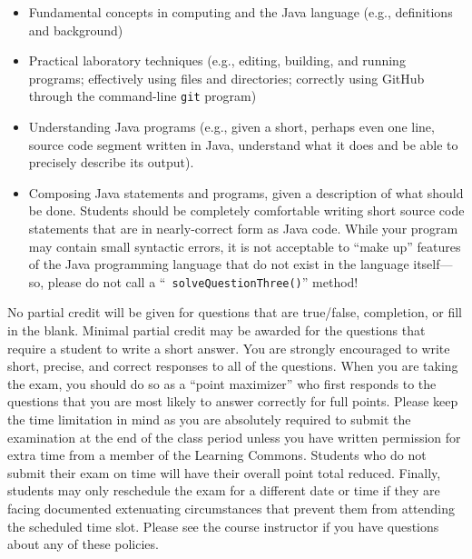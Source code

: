 \documentclass[11pt]{article}
\begin{document}
\vspace*{-.05in}
\begin{itemize}

  \itemsep 0in

  \item Fundamental concepts in computing and the Java language (e.g.,
    definitions and background)

  \item Practical laboratory techniques (e.g., editing, building, and running
    programs; effectively using files and directories; correctly using GitHub
    through the command-line {\tt git} program)

  \item Understanding Java programs (e.g., given a short, perhaps even one line,
    source code segment written in Java, understand what it does and be able to
    precisely describe its output).

  \item Composing Java statements and programs, given a description of what
    should be done. Students should be completely comfortable writing short
    source code statements that are in nearly-correct form as Java code. While
    your program may contain small syntactic errors, it is not acceptable to
    ``make up'' features of the Java programming language that do not exist in
    the language itself---so, please do not call a ``{\tt
    solveQuestionThree()}'' method!

\end{itemize}

\noindent No partial credit will be given for questions that are true/false,
completion, or fill in the blank. Minimal partial credit may be awarded for the
questions that require a student to write a short answer. You are strongly
encouraged to write short, precise, and correct responses to all of the
questions. When you are taking the exam, you should do so as a ``point
maximizer'' who first responds to the questions that you are most likely to
answer correctly for full points. Please keep the time limitation in mind as you
are absolutely required to submit the examination at the end of the class period
unless you have written permission for extra time from a member of the Learning
Commons. Students who do not submit their exam on time will have their overall
point total reduced. Finally, students may only reschedule the exam for a
different date or time if they are facing documented extenuating circumstances
that prevent them from attending the scheduled time slot. Please see the course
instructor if you have questions about any of these policies.
\end{document}
